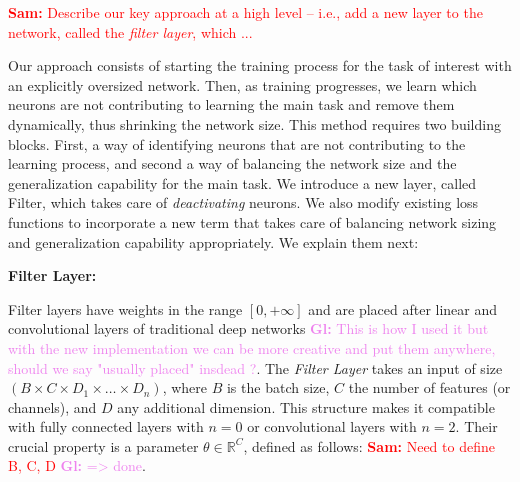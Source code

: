 \documentclass[sigconf]{acmart}
\newcommand{\srm}[1]{\textcolor{red}{{\bf Sam:} #1}}
\newcommand{\gl}[1]{\textcolor{violet}{{\bf Gl:} #1}}
\begin{document}
\srm{Describe our key approach at a high level -- i.e., add a new layer to the
network, called the {\it filter layer}, which ... }

Our approach consists of starting the training process for the task of interest
with an explicitly oversized network. Then, as training progresses, we learn
which neurons are not contributing to learning the main task and remove them
dynamically, thus shrinking the network size. This method requires two building
blocks. First, a way of identifying neurons that are not contributing to the
learning process, and second a way of balancing the network size and the
generalization capability for the main task. We introduce a new layer, called
\textsf{Filter}, which takes care of \emph{deactivating} neurons. We also modify
existing loss functions to incorporate a new term that takes care of balancing
network sizing and generalization capability appropriately. We explain them
next:

%
%
%


\textbf{Filter Layer: } 

Filter layers have weights in the range $[0,+\infty]$ and are placed after
linear and convolutional layers of traditional deep networks \gl{This is how I
  used it but with the new implementation we can be more creative and put them
  anywhere, should we say "usually placed" insdead ?}. The \textit{Filter
  Layer} takes an input of size $\left(B \times C \times D_1 \times \dots
  \times D_n\right)$, where $B$ is the batch size, $C$ the number of features
(or channels), and $D$ any additional dimension. This structure makes it
compatible with fully connected layers with $n=0$ or convolutional layers with
$n=2$. Their crucial property is a parameter $\theta \in \mathbb{R}^C$, defined
as follows: \srm{Need to define B, C, D} \gl{=> done}.  
\end{document}
